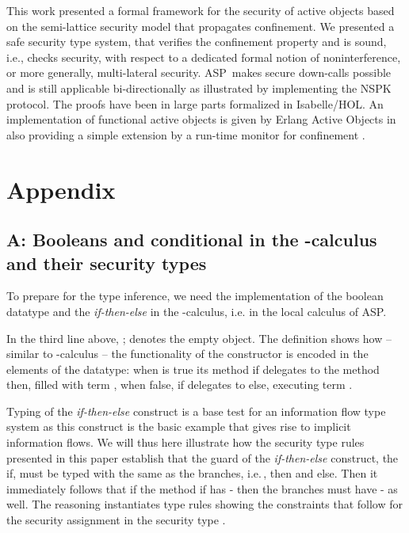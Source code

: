 \documentclass[10pt, conference, compsocconf]{IEEEtran}
\newcommand\aspfun{ASP\ }
\newcommand\aspfunp{ASP}
\newcommand\ie{i.e.\!\,, }
\begin{document}
{This work presented a formal framework for the security of active objects based on 
the semi-lattice security model that propagates confinement.  
We presented a safe security type system, that verifies the confinement property  and
is sound, i.e., checks security, with respect to a dedicated formal notion of noninterference, 
or more generally, multi-lateral security. 
\aspfun makes secure down-calls possible and is still applicable bi-directionally as 
illustrated by implementing the NSPK protocol. 
The proofs have been in large parts formalized in Isabelle/HOL.
An implementation of functional active objects is given by Erlang Active Objects in \cite{fk:10}
also providing a simple extension by a run-time monitor for confinement \cite{fk:11}.






\section*{Appendix}
\subsection*{A: Booleans and conditional in the -calculus and their security types}
To prepare for the type inference, we need the implementation
of the boolean datatype and the {\it if-then-else} in the -calculus, i.e. in the local calculus of \aspfunp. 



In the third line above, ;  denotes the empty
object. The definition shows how -- similar to -calculus -- the functionality of
the constructor is encoded in the elements of the datatype: when  is true 
its method if delegates to the method then, filled with
term , when false, if delegates to else, executing term .

Typing of the {\it if-then-else} construct is a base test for an information flow
type system as this construct is the basic example that gives rise to implicit
information flows. We will thus here illustrate how the security type rules presented
in this paper establish that the guard of the {\it if-then-else} construct, the if, must
be typed with the same  as the branches, \ie then and else. Then it immediately follows
that if the method if has - then the branches must have - as well.
The reasoning instantiates type rules showing the constraints that follow for the
security assignment in the security type .

}
\end{document}
